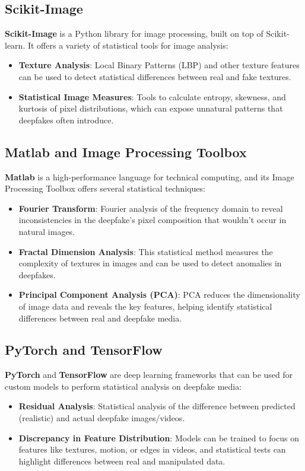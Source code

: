 \documentclass{article}
\begin{document}
\subsection{Scikit-Image}
\textbf{Scikit-Image} is a Python library for image processing, built on top of Scikit-learn. It offers a variety of statistical tools for image analysis:
\begin{itemize}
    \item \textbf{Texture Analysis}: Local Binary Patterns (LBP) and other texture features can be used to detect statistical differences between real and fake textures.
    \item \textbf{Statistical Image Measures}: Tools to calculate entropy, skewness, and kurtosis of pixel distributions, which can expose unnatural patterns that deepfakes often introduce.
\end{itemize}

\subsection{Matlab and Image Processing Toolbox}
\textbf{Matlab} is a high-performance language for technical computing, and its Image Processing Toolbox offers several statistical techniques:
\begin{itemize}
    \item \textbf{Fourier Transform}: Fourier analysis of the frequency domain to reveal inconsistencies in the deepfake’s pixel composition that wouldn't occur in natural images.
    \item \textbf{Fractal Dimension Analysis}: This statistical method measures the complexity of textures in images and can be used to detect anomalies in deepfakes.
    \item \textbf{Principal Component Analysis (PCA)}: PCA reduces the dimensionality of image data and reveals the key features, helping identify statistical differences between real and deepfake media.
\end{itemize}

\subsection{PyTorch and TensorFlow}
\textbf{PyTorch} and \textbf{TensorFlow} are deep learning frameworks that can be used for custom models to perform statistical analysis on deepfake media:
\begin{itemize}
    \item \textbf{Residual Analysis}: Statistical analysis of the difference between predicted (realistic) and actual deepfake images/videos.
    \item \textbf{Discrepancy in Feature Distribution}: Models can be trained to focus on features like textures, motion, or edges in videos, and statistical tests can highlight differences between real and manipulated data.
\end{itemize}
\end{document}
